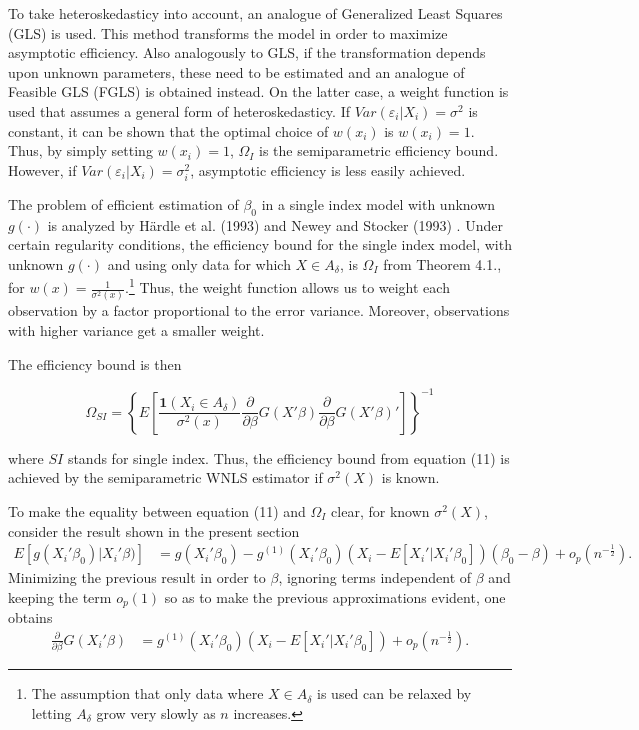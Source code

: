 To take heteroskedasticy into account, an analogue of Generalized Least Squares (GLS) is used. This method transforms the model in order to maximize asymptotic efficiency. Also analogously to GLS, if the transformation depends upon unknown parameters, these need to be estimated and an analogue of Feasible GLS (FGLS) is obtained instead. On the latter case, a weight function is used that assumes a general form of heteroskedasticy.
If $Var(\varepsilon_i|X_i) = \sigma^2$ is constant, it can be shown that the optimal choice of $w(x_i)$ is $w(x_i)=1$. Thus, by simply setting $w(x_i)=1$, $\Omega_I$ is the semiparametric efficiency bound. However, if $Var(\varepsilon_i|X_i) = \sigma_i^2$, asymptotic efficiency is less easily achieved.  

The problem of efficient estimation of $\beta_0$ in a single index model with unknown $g(\cdot)$ is analyzed by H{\"a}rdle et al. (1993) \cite{[18]} and Newey and Stocker (1993) \cite{[19]}. Under certain regularity conditions, the efficiency bound for the single index model, with unknown $g(\cdot)$ and using only data for which $X \in A_{\delta}$, is $\Omega_I$ from Theorem 4.1., for $w(x) = \frac{1}{\sigma^2(x)}$.\footnote{The assumption that only data where  $X \in A_{\delta}$ is used can be relaxed by letting $A_\delta$ grow very slowly as $n$ increases.} Thus, the weight function allows us to weight each observation by a factor proportional to the error variance. Moreover, observations with higher variance get a smaller weight. 

The efficiency bound is then

\begin{equation}
\Omega_{SI} = \left\{ E\left[\frac{\mathbf{1}{(X_i \in A_\delta)}}{\sigma^2(x)}\frac{\partial}{\partial \beta}
 G(X'\beta)\frac{\partial}{\partial \beta} G(X'\beta)' \right] \right\}^{-1}
\end{equation}

where $SI$ stands for single index. Thus, the efficiency bound from equation (11) is achieved by the semiparametric WNLS estimator if $\sigma^2(X)$ is known.

To make the equality between equation (11) and $\Omega_I$ clear, for known $\sigma^2(X)$, consider the result shown in the present section
\begin{align*}
E[g(X_i'\beta_0)|X_i'\beta)] & = g(X_i'\beta_0) - g^{(1)}(X_i'\beta_0)( X_i - E[X_i'|X_i'\beta_0])(\beta_0 - \beta) + o_p(n^{-\frac{1}{2}}).                                          
\end{align*}
Minimizing the previous result in order to $\beta$, ignoring terms independent of $\beta$ and keeping the term $o_p(1)$ so as to make the previous approximations evident, one obtains
\begin{align*}
 \frac{\partial}{\partial \beta} G(X_i'\beta) & = g^{(1)}(X_i'\beta_0)( X_i - E[X_i'|X_i'\beta_0]) + o_p(n^{-\frac{1}{2}}).
\end{align*}

